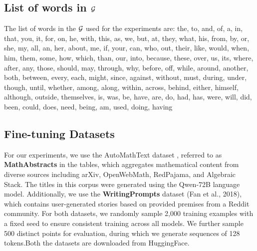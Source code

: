 \subsection{List of words in \(\mathcal{G}\)}
\label{appendix:listofgramset}
The list of words in the \(\mathcal{G}\) used for the experiments are:
the, to, and, of, a, in, that, you, it, for, on, he, with, this, as, we, but, at, they, what, his, from, by, or, she, my, all, an, her, about, me, if, your, can, who, out, their, like, would, when, him, them, some, how, which, than, our, into, because, these, over, us, its, where, after, any, those, should, may, through, why, before, off, while, around, another, both, between, every, each, might, since, against, without, must, during, under, though, until, whether, among, along, within, across, behind, either, himself, although, outside, themselves, is, was, be, have, are, do, had, has, were, will, did, been, could, does, need, being, am, used, doing, having




\subsection{Fine-tuning Datasets}


For our experiments, we use the AutoMathText dataset , referred to as \textbf{MathAbstracts} in the tables, which aggregates mathematical content from diverse sources including arXiv, OpenWebMath, RedPajama, and Algebraic Stack. The titles in this corpus were generated using the Qwen-72B language model. Additionally, we use the \textbf{WritingPrompts} dataset (Fan et al., 2018), which contains user-generated stories based on provided premises from a Reddit community. For both datasets, we randomly sample 2,000 training examples with a fixed seed to ensure consistent training across all models. We further sample 500 distinct points for evaluation, during which we generate sequences of 128 tokens.Both the datasets are downloaded from HuggingFace.

